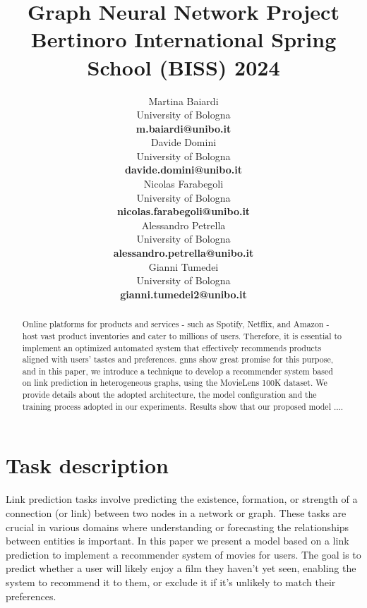 \documentclass[11pt]{article}
\title{Graph Neural Network Project \\
Bertinoro International Spring School (BISS) 2024}
\author{
  Martina Baiardi \\
  University of Bologna \\
  {\bf m.baiardi@unibo.it} \\ \And
  Davide Domini \\
  University of Bologna \\
  {\bf davide.domini@unibo.it} \\  \And
  Nicolas Farabegoli \\
  University of Bologna \\
  {\bf nicolas.farabegoli@unibo.it} \\  \AND
  Alessandro Petrella\\
  University of Bologna \\
  {\bf alessandro.petrella@unibo.it} \\ \And
  Gianni Tumedei \\
  University of Bologna \\
  {\bf gianni.tumedei2@unibo.it}
}
\newcommand{\meta}[1]{{\color{blue}#1}}
\begin{document}
\maketitle

\begin{abstract}

Online platforms for products and services - such as Spotify, Netflix, and Amazon - 
host vast product inventories and cater to millions of users. 
Therefore, it is essential to implement an optimized automated system that effectively 
recommends products aligned with users' tastes and preferences.  
%
\acp{gnn} show great promise for this purpose, and in this paper, 
we introduce a technique to develop a recommender system based on 
link prediction in heterogeneous graphs, using the MovieLens 100K dataset.
%
We provide details about the adopted architecture, the model configuration and the training
process adopted in our experiments.
%
Results show that our proposed model ....

\end{abstract}

\section{Task description}\label{sec:task-description}
Link prediction tasks involve predicting the existence, formation, 
or strength of a connection (or link) between two nodes in a network or graph. 
These tasks are crucial in various domains where understanding or forecasting the relationships 
between entities is important. 
In this paper we present a model based on a link prediction to implement a recommender system of movies for users.
The goal is to predict whether a user will likely enjoy a film they haven't yet seen, 
enabling the system to recommend it to them, or exclude it if it's unlikely to match their preferences.
\end{document}
